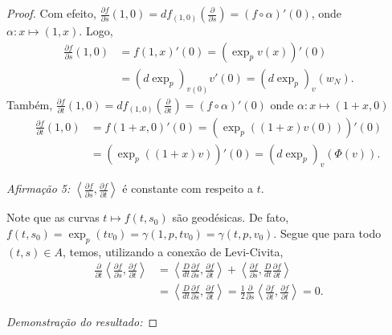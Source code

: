 \begin{theorem}
\begin{proof}
        Com efeito, $\frac{\partial f}{\partial s}(1,0) = df_{(1,0)}\left(\frac{\partial}{\partial s}\right) = (f \circ \alpha)'(0)$, onde $\alpha: x \mapsto (1,x)$. Logo,
        \begin{align*}
            {\frac{\partial f}{\partial s}(1,0)} & = f(1, x)'(0)    = (\exp_p v(x))'(0)             \\
                                                 & = (d\exp_p)_{v(0)} v'(0)  = (d\exp_p)_v (w_{N}).
        \end{align*}
        Também, $\frac{\partial f}{\partial t}(1,0) = df_{(1,0)}\left(\frac{\partial}{\partial t}\right) = (f \circ \alpha)'(0)$ onde $\alpha: x \mapsto (1+x, 0)$
        \begin{align*}
            {\frac{\partial f}{\partial t}(1,0)} & = f(1+x, 0)'(0)   = (\exp_p((1+x)v(0)))'(0)        \\
                                                 & = (\exp_p((1+x)v))'(0)  = {(d\exp_p)_v (\Phi(v))}.
        \end{align*}

        \emph{Afirmação 5:} $\left\langle \frac{\partial f}{\partial s}, \frac{\partial f}{\partial t} \right\rangle$ é constante com respeito a $t$.

        Note que as curvas $t \mapsto f(t,s_{0})$ são geodésicas. De fato, $f(t,s_{0})=\exp_{p}(tv_{0})=\gamma(1,p,tv_{0})=\gamma(t,p,v_{0})$. Segue que para todo $(t,s) \in A$, temos, utilizando a conexão de Levi-Civita,
        \begin{align*}
            \frac{\partial}{\partial t}\left\langle \frac{\partial f}{\partial s}, \frac{\partial f}{\partial t} \right\rangle & = \left\langle \frac{D}{dt}\frac{\partial f}{\partial s}, \frac{\partial f}{\partial t} \right\rangle+ \left\langle \frac{\partial f}{\partial s}, \frac{D}{dt}\frac{\partial f}{\partial t} \right\rangle                                        \\
                                                                                                                               & = \left\langle \frac{D}{dt}\frac{\partial f}{\partial s}, \frac{\partial f}{\partial t} \right\rangle        = \frac{1}{2}\frac{\partial}{\partial s}\left\langle \frac{\partial f}{\partial t}, \frac{\partial f}{\partial t} \right\rangle = 0.
        \end{align*}

        \emph{Demonstração do resultado:}


\end{proof}
\end{theorem}
